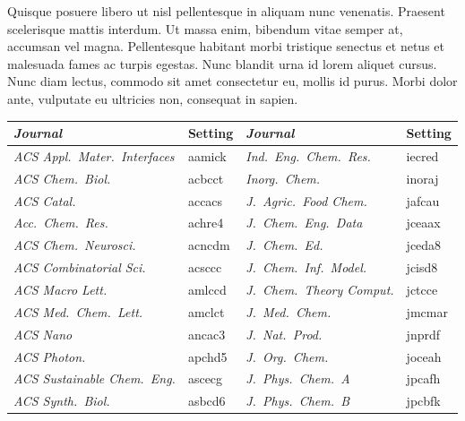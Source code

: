 \documentclass[english,journal=jctcce,etalmode=truncate,maxauthors=0]{achemso}
\begin{document}
Quisque posuere libero ut nisl pellentesque in aliquam nunc venenatis. Praesent scelerisque mattis interdum. Ut massa enim, bibendum vitae semper at, accumsan vel magna. Pellentesque habitant morbi tristique senectus et netus et malesuada fames ac turpis egestas. Nunc blandit urna id lorem aliquet cursus. Nunc diam lectus, commodo sit amet consectetur eu, mollis id purus. Morbi dolor ante, vulputate eu ultricies non, consequat in sapien.

\begin{table}
  \centering
  \begin{tabular}{@{}>{\itshape}l>{\ttfamily}l>{\itshape}l>{\ttfamily}l@{}}
    \toprule
      Journal & \rmfamily Setting & Journal & \rmfamily Setting \\
    \midrule
      ACS Appl.\ Mater.\ Interfaces   & aamick &
      Ind.\ Eng.\ Chem.\ Res.         & iecred \\
      ACS Chem.\ Biol.                & acbcct &
      Inorg.\ Chem.                   & inoraj \\
      ACS Catal.                      & accacs &
      J.~Agric.\ Food Chem.           & jafcau \\
      Acc.\ Chem.\ Res.               & achre4 &
      J.~Chem.\ Eng.\ Data            & jceaax \\
      ACS Chem.\ Neurosci.            & acncdm &
      J.~Chem.\ Ed.                   & jceda8 \\
      ACS Combinatorial Sci.          & acsccc &
      J.~Chem.\ Inf.\ Model.          & jcisd8 \\
      ACS Macro Lett.                 & amlccd &
      J.~Chem.\ Theory Comput.        & jctcce \\
      ACS Med.\ Chem.\ Lett.          & amclct &
      J.~Med.\ Chem.                  & jmcmar \\
      ACS Nano                        & ancac3 &
      J.~Nat.\ Prod.                  & jnprdf \\
      ACS Photon.                     & apchd5 &
      J.~Org.\ Chem.                  & joceah \\
      ACS Sustainable Chem.\ Eng.     & ascecg &
      J.~Phys.\ Chem.~A               & jpcafh \\
      ACS Synth.\ Biol.               & asbcd6 &
      J.~Phys.\ Chem.~B               & jpcbfk \\

\end{tabular}
\end{table}
\end{document}
